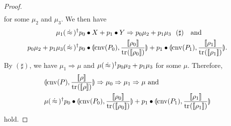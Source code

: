 \begin{proof}
\begin{align*}
\end{align*}
for some $\mu_2$ and $\mu_3$. We then have
\begin{align*}
\mu_1 (\strg)^\dagger &
 p_0 \bullet X + p_1 \bullet Y
 \Rightarrow
 p_0 \mu_2 +  p_1 \mu_3 ~~ (\sharp)~~ \mbox{ and }\\
 p_0 \mu_2 +  p_1 \mu_3
 (\strg)^\dagger &
 p_0 \bullet \con{\cnv{P_0}}{\frac{\braw{\rho_0}}{\tr{}{\braw{\rho_0}}}}
+
 p_1 \bullet \con{\cnv{P_1}}{\frac{\braw{\rho_1}}{\tr{}{\braw{\rho_1}}}}.
\end{align*}
By $(\sharp)$, we have $\mu_1 \Rightarrow \mu$ and $\mu (\,\dot\approx\,)^\dagger
p_0 \mu_2 + p_1 \mu_3$ for some $\mu$.
Therefore,
 \begin{align*}
  &\con{\cnv{P}}{\frac{\braw{\rho}}{\tr{}{\braw{\rho}}}}
  \Rightarrow \mu_0 \Rightarrow \mu_1 \Rightarrow \mu \mbox{ and}\\
  &\mu  (\strg)^\dagger 
  p_0 \bullet \con{\cnv{P_0}}{\frac{\braw{\rho_0}}
  {\tr{}{\braw{\rho_0}}}}
  +
  p_1 \bullet
  \con{\cnv{P_1}}{\frac{\braw{\rho_1}}{\tr{}{\braw{\rho_1}}}}
 \end{align*}
hold.
\end{proof}

